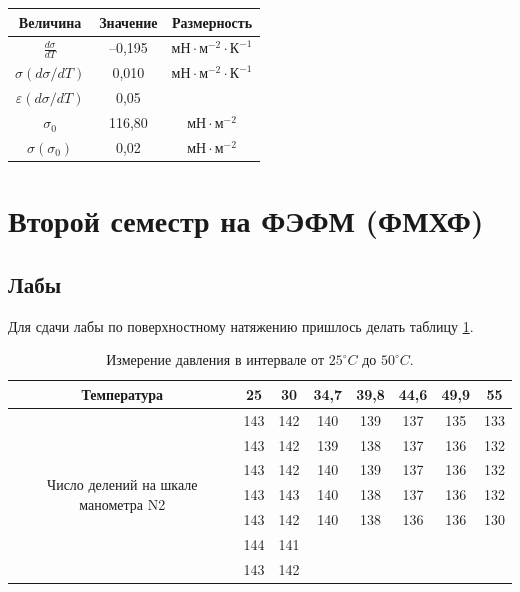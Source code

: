 \documentclass[a4paper,12pt]{article}
\begin{document}
\begin{tabular}{|c|c|c|}
	\hline 
	\rule[-1ex]{0pt}{2.5ex} Величина & Значение & Размерность \\ 
	\hline 
	\rule[-2ex]{0pt}{5.5ex} $\displaystyle \frac{d\sigma}{dT}$ & --0,195 & $\text{мН} \cdot \text{м}^{-2} \cdot 	\text{К}^{-1}$ \\ 
	\hline 
	\rule[-1ex]{0pt}{3.5ex} $\sigma (d\sigma / dT) $& 0,010 & $\text{мН} \cdot \text{м}^{-2} \cdot \text{К}^{-1}$ \\ 
	\hline 
	\rule[-1ex]{0pt}{3.5ex} $\varepsilon (d\sigma / dT) $ & 0,05 &  \\ 
	\hline 
	\rule[-1ex]{0pt}{3.5ex} $\sigma _0 $ & 116,80 & $\text{мН} \cdot \text{м}^{-2}$ \\ 
	\hline 
	\rule[-1ex]{0pt}{3.5ex} $\sigma (\sigma _0) $ & 0,02 & $\text{мН} \cdot \text{м}^{-2}$ \\ 
	\hline 
\end{tabular} 


\section{Второй семестр на ФЭФМ (ФМХФ)}

\subsection{Лабы}

Для сдачи лабы по поверхностному натяжению пришлось делать таблицу \ref{tab:pressure_genphys}.

\begin{table}[!h]
\caption[Говно]{Измерение давления в интервале от $25^{\circ}C$ до $50^{\circ}C$.}\label{tab:pressure_genphys}
\begin{tabular}{|c|c|c|c|c|c|c|c|}
\hline
Температура                                            & 25  & 30  & 34,7 & 39,8 & 44,6 & 49,9 & 55  \\ \hline
\multirow{7}{*}{Число   делений на шкале манометра N2} & 143 & 142 & 140  & 139  & 137  & 135  & 133 \\ \cline{2-8} 
                                                       & 143 & 142 & 139  & 138  & 137  & 136  & 132 \\ \cline{2-8} 
                                                       & 143 & 142 & 140  & 139  & 137  & 136  & 132 \\ \cline{2-8} 
                                                       & 143 & 143 & 140  & 138  & 137  & 136  & 132 \\ \cline{2-8} 
                                                       & 143 & 142 & 140  & 138  & 136  & 136  & 130 \\ \cline{2-8} 
                                                       & 144 & 141 &      &      &      &      &     \\ \cline{2-8} 
                                                       & 143 & 142 &      &      &      &      &     \\ \hline
\end{tabular}
\end{table}
\end{document}
